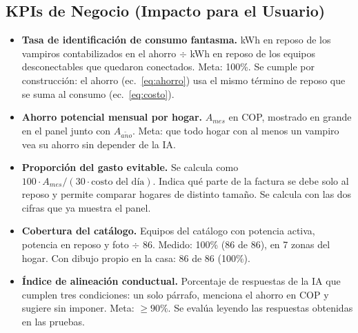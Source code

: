 \documentclass[10pt,journal,compsoc]{IEEEtran}
\begin{document}
\subsection{KPIs de Negocio (Impacto para el Usuario)}
\begin{itemize}
\item \textbf{Tasa de identificación de consumo fantasma.} kWh en reposo de los vampiros contabilizados en el ahorro $\div$ kWh en reposo de los equipos desconectables que quedaron conectados. Meta: 100\%. Se cumple por construcción: el ahorro (ec.~\ref{eq:ahorro}) usa el mismo término de reposo que se suma al consumo (ec.~\ref{eq:costo}).
\item \textbf{Ahorro potencial mensual por hogar.} $A_{mes}$ en COP, mostrado en grande en el panel junto con $A_{a\tilde{n}o}$. Meta: que todo hogar con al menos un vampiro vea su ahorro sin depender de la IA.
\item \textbf{Proporción del gasto evitable.} Se calcula como $100\cdot A_{mes} / (30\cdot\text{costo del día})$. Indica qué parte de la factura se debe solo al reposo y permite comparar hogares de distinto tamaño. Se calcula con las dos cifras que ya muestra el panel.
\item \textbf{Cobertura del catálogo.} Equipos del catálogo con potencia activa, potencia en reposo y foto $\div$ 86. Medido: 100\% (86 de 86), en 7 zonas del hogar. Con dibujo propio en la casa: 86 de 86 (100\%).
\item \textbf{Índice de alineación conductual.} Porcentaje de respuestas de la IA que cumplen tres condiciones: un solo párrafo, menciona el ahorro en COP y sugiere sin imponer. Meta: $\ge 90\%$. Se evalúa leyendo las respuestas obtenidas en las pruebas.
\end{itemize}
\end{document}
